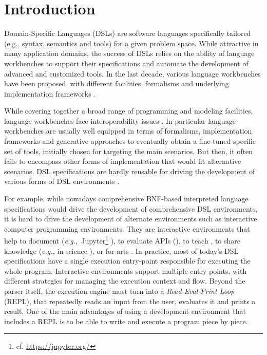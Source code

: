 \section{Introduction}

Domain-Specific Languages (DSLs) are software languages specifically tailored (e.g., syntax, semantics and tools) for a given problem space. While attractive in many application domains, the success of DSLs relies on the ability of language workbenches to support their specifications and automate the development of advanced and customized tools. In the last decade, various language workbenches have been proposed, with different facilities, formalisms and underlying implementation frameworks \cite{DBLP:journals/cl/ErdwegSVTBCGH0L15}.	

While covering together a broad range of programming and modeling facilities, language workbenches face interoperability issues \cite{coulon:hal-01889155}. In particular language workbenches are usually well equipped in terms of formalisms, implementation frameworks and generative approaches to eventually obtain a fine-tuned specific set of tools, initially chosen for targeting the main scenarios. But then, it often fails to encompass other forms of implementation that would fit alternative scenarios. DSL specifications are hardly reusable for driving the development of various forms of DSL environments \cite{acher:hal-01061576}.

For example, while nowadays comprehensive BNF-based interpreted language specifications would drive the development of comprehensive DSL environments, it is hard to drive the development of alternate environments such as interactive computer programming environments. They are interactive environments that help to document (\emph{e.g.,} Jupyter\footnote{cf. \url{https://jupyter.org/}} \cite{Shen14}), to evaluate APIs (\cite{DBLP:conf/models/TombelleV06,sarid2016api}), to teach \cite{Allen:2002:DLP:563340.563395,Gray:2003:PGI:949344.949394,10.1007/BFb0033856}, to share knowledge (\emph{e.g.,} in science \cite{4160251,Perkel19}), or for arts \cite{quteprints31056}. In practice, most of today's DSL specifications have a single execution entry-point responsible for executing the whole program. Interactive environments support multiple entry points, with different strategies for managing the execution context and flow. Beyond the parser itself, the execution engine must turn into a \textit{Read-Eval-Print Loop} (REPL), that repeatedly reads an input from the user, evaluates it and prints a result. One of the main advantages of using a development environment that includes a REPL is to be able to write and execute a program piece by piece.

